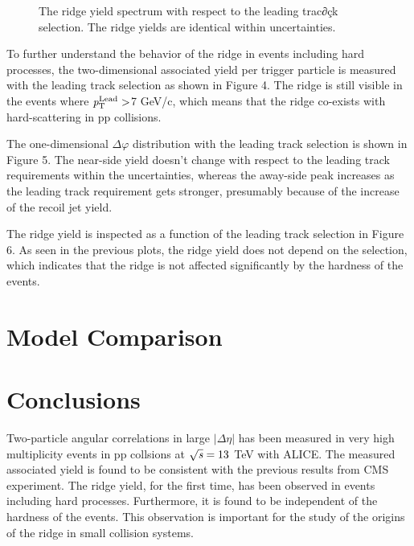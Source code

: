 \documentclass[ALICE,manyauthors]{cernphprep}
\begin{document}
\begin{figure}
	\centering
	\caption{ The ridge yield spectrum with respect to the leading trac∂çk selection. The ridge yields are identical within uncertainties.}
\end{figure}

To further understand the behavior of the ridge in events including hard processes, the two-dimensional associated yield per trigger particle is measured with the leading track selection as shown in Figure 4. The ridge is still visible in the events where $\it{p}_{\rm{T}}^{\rm{Lead}}>$7 GeV/c, which means that the ridge co-exists with hard-scattering in pp collisions. 

The one-dimensional $\Delta\varphi$ distribution with the leading track selection is shown in Figure 5. The near-side yield doesn't change with respect to the leading track requirements within the uncertainties, whereas the away-side peak increases as the leading track requirement gets stronger, presumably because of the increase of the recoil jet yield.

The ridge yield is inspected as a function of the leading track selection in Figure 6. As seen in the previous plots, the ridge yield does not depend on the selection, which indicates that the ridge is not affected significantly by the hardness of the events.

\section{Model Comparison}


\section{Conclusions}

Two-particle angular correlations in large $|\Delta\eta|$ has been measured in very high multiplicity events in pp collsions at $\sqrt{\it{s}}=13$ TeV with ALICE. The measured associated yield is found to be consistent with the previous results from CMS experiment. The ridge yield, for the first time, has been observed in events including hard processes. Furthermore, it is found to be independent of the hardness of the events. This observation is important for the study of the origins of the ridge in small collision systems.
\end{document}
